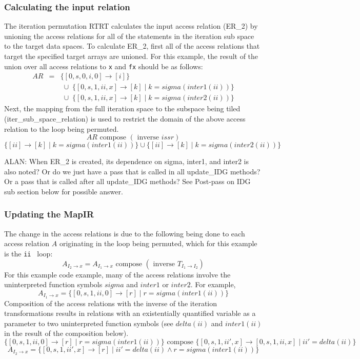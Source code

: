 \documentclass{article}
\begin{document}
\subsubsection{Calculating the input relation}

The iteration permutation RTRT calculates the input access relation (ER\_2) by unioning the access relations for all of the statements in the iteration sub space to the target data spaces.  To calculate ER\_2, first all of the access relations that target the specified target arrays are unioned.  For this example, the result of the union over all access relations to {\tt x} and {\tt fx} should be as follows:
\[
\begin{array}{rcl}
	AR & = & \{ [0, s, 0, i, 0 ] \rightarrow [ i ]  \} \\
	& & \; \cup \; \{ [0, s, 1, ii, x ] \rightarrow [ k ] \; | \; k = sigma(inter1(ii)) \} \\
	& & \; \cup \; \{ [0, s, 1, ii, x ] \rightarrow [ k ] \; | \; k = sigma(inter2(ii)) \}
\end{array}
\]
Next, the mapping from the full iteration space to the subspace being tiled (iter\_sub\_space\_relation) is used to restrict the domain of the above access relation to the loop being permuted.
\[
  AR \mbox{ compose } (\mbox{ inverse } issr)
\]
\[
\{ [ ii ] \rightarrow [ k ] \; | \; k = sigma(inter1(ii)) \} \cup \{ [ ii ] \rightarrow [ k ] \; | \; k = sigma(inter2(ii)) \}
\]
 
ALAN:
When ER\_2 is created, its dependence on sigma, inter1, and inter2 is also noted?  Or do we just have a pass that is called in all update\_IDG methods?  Or a pass that is called after all update\_IDG methods?  See Post-pass on IDG sub section below for possible answer.

\subsubsection{Updating the MapIR}

The change in the access relations is due to the following being done to each access relation $A$ originating in the loop being permuted, which for this example is the {\tt ii } loop:
\[
	 A_{I_2 \rightarrow x} = A_{I_1 \rightarrow x} \mbox{ compose } (\mbox{ inverse } T_{I_1 \rightarrow I_2})
\]
For this example code example, many of the access relations involve the uninterpreted function symbols
$sigma$ and $inter1$ or $inter2$.  For example, 
\[
	 A_{I_1 \rightarrow x} = \{ [0, s, 1, ii, 0 ] \rightarrow [ r ] \; | \; r = sigma( inter1(ii) ) \}
\]
Composition of the access relations with the inverse of the iteration transformations results
in relations with an existentially quantified variable as a parameter to two uninterpreted function symbols (see $delta(ii)$ and $inter1(ii)$ in the result of the composition below).
\[
	 \{ [0, s, 1, ii, 0 ] \rightarrow [ r ] \; | \; r = sigma( inter1(ii) ) \} \mbox{ compose }  \{   [ 0, s, 1, ii', x] \rightarrow [0, s, 1, ii, x ] \; | \; ii' = delta(ii) \}
\]
\[
	 A_{I_2 \rightarrow x} = \{  [ 0, s, 1, ii', x] \rightarrow  [ r ] \; | \; ii' = delta(ii) \wedge r = sigma( inter1(ii) ) \}
\]
\end{document}
